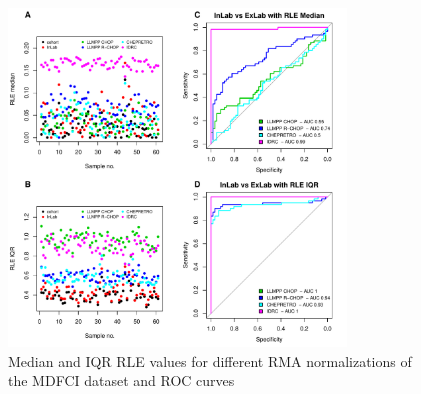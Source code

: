 \documentclass{article}
\begin{document}
\begin{figure}
	\begin{center}
		\includegraphics[width=0.8\textwidth]{figures/MDFCI_rle.pdf}
	\end{center}
	\caption{Median and IQR RLE values for different RMA normalizations of the MDFCI dataset and ROC curves}
	\label{fig:mdfci_rle}
\end{figure}






\end{document}
